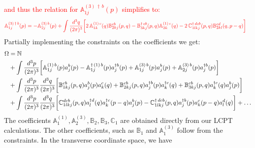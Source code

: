 \documentclass[10pt]{article}
\def\mf#1{\mathbb{#1}}
\numberwithin{equation}{section}
\begin{document}
\textcolor{red}{and thus
the relation for $\mf{A}^{(3)\, \dagger\, b}_{1j}(p)$ simplifies to:}
\begin{align}
 \color{red}\mf{A}^{(3)\, \dagger\, b}_{1j}(p) & \color{red}= -\mf{A}^{(3)\, b}_{2j}(p) +\int \frac{d^{3}q}{(2\pi)^{3}}\bigg[2\, \mf{A}^{(1)\, c}_{1k}(q)\mf{B}^{cb}_{2kj}(p,q)-\mf{B}^{\dagger\, cb}_{3kj}(p,q)\mf{A}^{(1)\,c}_{2k}(q)-2\,\mf{C}^{\dagger\, dcb}_{1lkj}(p,q)\mf{B}^{cd}_{2kl}(q,p-q)\bigg]
 \end{align}
 Partially implementing the constraints on the coefficients we get:
\begin{align}
    \Omega  & = \mf{N}  \notag \\ & +
                \int \frac{d^3p}{(2\pi)^3} 
                \bigg[ 
                   \mf{A}^{(1)\, b}_{1j}(p)a^{b}_{j}(p) 
                -  \mf{A}^{\dagger\, (1)\, b}_{1j} (p) a^{\dagger b}_{j}(p)+ \mf{A}^{(3)\, b}_{1j}(p)a^{b}_{j}(p) 
                +  \mf{A}^{(3)\, b}_{2j} (p) a^{\dagger b}_{j}(p)\bigg] \notag \\ & 
               +\int \frac{d^3p}{(2\pi)^3} \frac{d^3q}{(2\pi)^3} 
               \bigg[\mf{B}^{cb}_{1kj}(p,q) a^{b}_{j}(p)a^{c}_{k}(q) 
                   + \mf{B}^{cb}_{2kj}(p,q) a^{\dagger b}_{j}(p)a^{\dagger c}_{k}(q)
               + \mf{B}^{cb}_{3kj} (p,q) a^{\dagger c}_{k}(q)a^{b}_{j}(p)
               \bigg] \notag \\ & 
               + \int 
               \frac{d^3p}{(2\pi)^3} \frac{d^3q}{(2\pi)^3} 
               \bigg[
                \mf{C}^{ dcb}_{1lkj}(p,q) a^{\dagger d}_{l}(q)  a^{\dagger c}_{k}(p-q)  a^{b}_{j}(p)
               - \mf{C}^{\dagger\, dcb}_{1lkj}(p,q) a^{\dagger b}_{j}(p) a^{c}_{k}(p-q) a^{d}_{l}(q)\bigg] +\ldots
\end{align}
The coefficients $\mf{A}^{(1)}_{1}, \mf{A}^{(3)}_{2}, \mf{B}_{2}, \mf{B}_{3}, \mf{C}_{1}$ are obtained directly from our LCPT calculations. The other coefficients, such as $\mf{B}_{1}$ and $\mf{A}^{(3)}_{1}$ follow from the constraints. In the transverse coordinate space, we have
\end{document}
